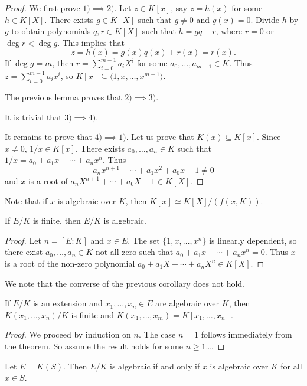 \begin{proof}
	We first prove $1)\implies 2)$. Let $z\in K[x]$, say $z=h(x)$ for some $h\in K[X]$. There exists
	$g\in K[X]$ such that $g\ne 0$ and $g(x)=0$. Divide $h$ by $g$ to obtain 
	polynomials $q,r\in K[X]$ such that $h=gq+r$, where $r=0$ or $\deg r<\deg g$. This implies that
	\[
		z=h(x)=g(x)q(x)+r(x)=r(x).
	\]
	If $\deg g=m$, then $r=\sum_{i=0}^{m-1}a_iX^i$ for some $a_0,\dots,a_{m-1}\in K$. Thus
	$z=\sum_{i=0}^{m-1}a_ix^i$, so $K[x]\subseteq\langle 1,x,\dots,x^{m-1}\rangle$. 

	The previous lemma proves that $2)\implies 3)$. 

	It is trivial that $3)\implies 4)$. 

	It remains to prove that $4)\implies 1)$. Let us prove that $K(x)\subseteq K[x]$. 
	Since $x\ne 0$, $1/x\in K[x]$. There exists $a_0,\dots,a_n\in K$ such that
	$1/x=a_0+a_1x+\cdots+a_nx^n$. Thus
	\[
		a_nx^{n+1}+\cdots+a_1x^2+a_0x-1\ne 0
	\]
	and $x$ is a root of $a_nX^{n+1}+\cdots+a_0X-1\in K[X]$. 
\end{proof}

Note that if $x$ is algebraic over $K$, then
$K[x]\simeq K[X]/(f(x,K))$. 

\begin{corollary}
	If $E/K$ is finite, then $E/K$ is algebraic. 
\end{corollary}

\begin{proof}
	Let $n=[E:K]$ and $x\in E$. The set $\{1,x,\dots,x^n\}$ is linearly dependent, 
	so there exist $a_0,\dots,a_n\in K$ not all zero such that
	$a_0+a_1x+\cdots+a_nx^n=0$. Thus $x$ is a root of the non-zero
	polynomial $a_0+a_1X+\cdots+a_nX^n\in K[X]$. 
\end{proof}

We note that the converse of the previous corollary does not hold. 

\begin{corollary}
	If $E/K$ is an extension and $x_1,\dots,x_n\in E$ 
	are algebraic over $K$, then 
	$K(x_1,\dots,x_n)/K$ is finite and
	$K(x_1,\dots,x_m)=K[x_1,\dots,x_n]$. 
\end{corollary}

\begin{proof}
	We proceed by induction on $n$. The case $n=1$ follows immediately from 
	the theorem. So assume the result holds for some $n\geq1$\dots.
\end{proof}

\begin{corollary}
	Let $E=K(S)$. Then $E/K$ is algebraic if and only if
	$x$ is algebraic over $K$ for all $x\in S$. 
\end{corollary}


